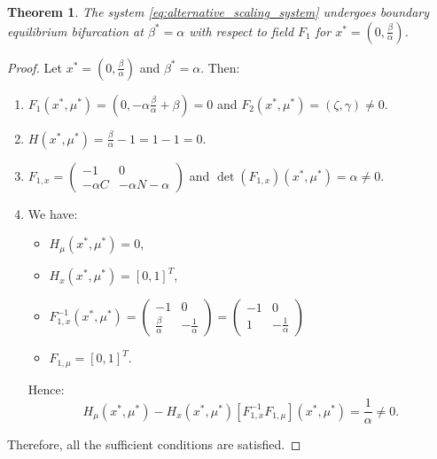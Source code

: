 \documentclass[10pt,a4paper]{amsart}
\newtheorem{theorem}{Theorem}
\begin{document}
\begin{theorem}
    The system \eqref{eq:alternative_scaling_system} undergoes boundary equilibrium bifurcation at $\beta^*=\alpha$ with respect to field $F_1$ for $x^*=\left(0, \frac{\beta}{\alpha} \right)$.
\end{theorem}

\begin{proof}
    Let $x^*=\left(0, \frac{\beta}{\alpha}\right)$ and $\beta^*=\alpha$. 
    Then:
    \begin{enumerate}
        \item $F_1(x^*, \mu^*) = \left(0, -\alpha \frac{\beta}{\alpha} + \beta\right) = 0 $ and $F_2(x^*, \mu^*)=(\zeta, \gamma) \neq 0.$
        \item $H(x^*, \mu^*)=\frac{\beta}{\alpha} - 1 = 1-1 = 0.$
        \item $F_{1,x} = \begin{pmatrix}
        -1 & 0 \\
        -\alpha C & -\alpha N - \alpha
        \end{pmatrix}$ and $\det(F_{1,x})(x^*, \mu^*) = \alpha \neq 0.$
    \item We have: 
    \begin{itemize}
        \item $H_{\mu}(x^*, \mu^*) = 0$,
        \item $H_x(x^*, \mu^*) = [0, 1]^T$,
        \item $F_{1, x}^{-1}(x^*, \mu^*) = \begin{pmatrix}
        -1 & 0 \\
        \frac{\beta}{\alpha} & -\frac{1}{\alpha}
        \end{pmatrix} = \begin{pmatrix}
        -1 & 0 \\
        1 & -\frac{1}{\alpha}
        \end{pmatrix}$
        \item $F_{1, \mu} = [0, 1]^T.$
    \end{itemize}
    Hence:
    \begin{equation}
        H_{\mu}(x^*,\mu^*) - H_x(x^*,\mu^*)[F_{1,x}^{-1} F_{1, \mu}](x^*,\mu^*) =\frac{1}{\alpha} \neq 0.
    \end{equation}
    \end{enumerate}
    Therefore, all the sufficient conditions are satisfied.
\end{proof}
\end{document}
